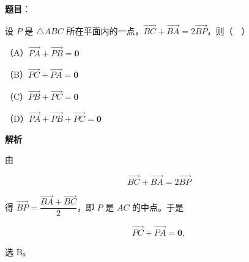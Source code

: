 \begin{answer}

\textbf{题目}：

设 $P$ 是 $\triangle ABC$ 所在平面内的一点，$\overrightarrow{BC}+\overrightarrow{BA}=2\overrightarrow{BP}$，则（　）

（A）$\overrightarrow{PA}+\overrightarrow{PB}=\mathbf 0$

（B）$\overrightarrow{PC}+\overrightarrow{PA}=\mathbf 0$

（C）$\overrightarrow{PB}+\overrightarrow{PC}=\mathbf 0$

（D）$\overrightarrow{PA}+\overrightarrow{PB}+\overrightarrow{PC}=\mathbf 0$

\textbf{解析}

由

\nopagebreak[4]
\[\overrightarrow{BC}+\overrightarrow{BA}=2\overrightarrow{BP}\]

得 $\overrightarrow{BP}=\dfrac{\overrightarrow{BA}+\overrightarrow{BC}}{2}$，即 $P$ 是 $AC$ 的中点。于是

\nopagebreak[4]
\[\overrightarrow{PC}+\overrightarrow{PA}=\mathbf 0,\]

选 B。


\end{answer}

